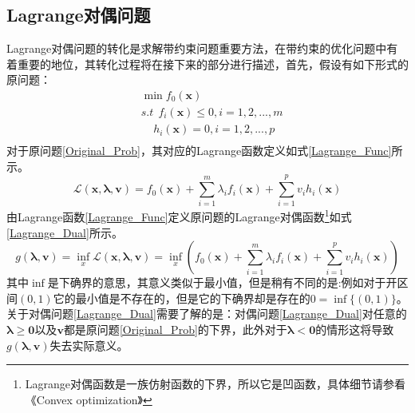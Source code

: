 \subsection{Lagrange对偶问题}
\label{sec:Lagrange_prob}
Lagrange对偶问题的转化是求解带约束问题重要方法，在带约束的优化问题中有着重要的地位，其转化过程将在接下来的部分进行描述，首先，假设有如下形式的原问题：
\begin{equation}
\label{Original_Prob}
\begin{split}
&\min f_0(\bm{x})\\
&s.t~~f_i(\bm{x})\leq 0,i=1,2,...,m\\
&~~~~~h_i(\bm{x}) =0,i=1,2,...,p\\
\end{split}
\end{equation}
对于原问题\ref{Original_Prob}，其对应的Lagrange函数定义如式\ref{Lagrange_Func}所示。
\begin{equation}
\label{Lagrange_Func}
\mathcal{L}(\bm{x},\bm{\lambda},\bm{v})=f_0(\bm{x})+\sum_{i=1}^{m}\lambda_i f_i(\bm{x})+\sum_{i=1}^{p}v_ih_i(\bm{x})
\end{equation}
由Lagrange函数\ref{Lagrange_Func}定义原问题的Lagrange对偶函数\footnote{Lagrange对偶函数是一族仿射函数的下界，所以它是凹函数，具体细节请参看《Convex optimization》}如式\ref{Lagrange_Dual}所示。
\begin{equation}
\label{Lagrange_Dual}
g(\bm{\lambda},\bm{v})=\inf_{x}\mathcal{L}(\bm{x},\bm{\lambda},\bm{v})=\inf_{x}\left(f_0(\bm{x})+\sum_{i=1}^{m}\lambda_i f_i(\bm{x})+\sum_{i=1}^{p}v_ih_i(\bm{x})\right)
\end{equation}
其中$\inf$是下确界的意思，其意义类似于最小值，但是稍有不同的是:例如对于开区间$(0,1)$它的最小值是不存在的，但是它的下确界却是存在的$0=\inf\{(0,1)\}$。关于对偶问题\ref{Lagrange_Dual}需要了解的是：对偶问题\ref{Lagrange_Dual}对任意的$\bm{\lambda} \geq \bm{0}$以及$\bm{v}$都是原问题\ref{Original_Prob}的下界，此外对于$\bm{\lambda} < \bm{0}$的情形这将导致$g(\bm{\lambda},\bm{v})$失去实际意义。

